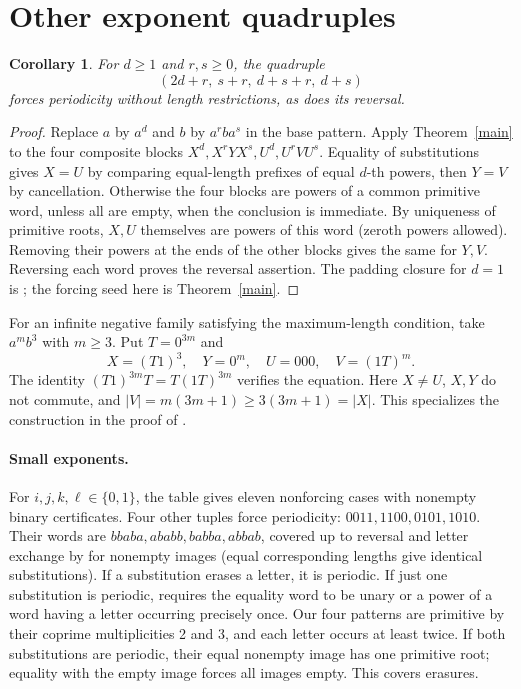 \documentclass[10pt]{article}
\newtheorem{corollary}[theorem]{Corollary}
\theoremstyle{remark}\newtheorem*{remark}{Remark}
\begin{document}
\section{Other exponent quadruples}
\begin{corollary}
For \(d\ge1\) and \(r,s\ge0\), the quadruple
\[
 (2d+r,\ s+r,\ d+s+r,\ d+s)
\]
forces periodicity without length restrictions, as does its reversal.
\end{corollary}
\begin{proof}
Replace \(a\) by \(a^d\) and \(b\) by \(a^r b a^s\) in the base pattern. Apply Theorem~\ref{main} to the four composite blocks \(X^d,X^rYX^s,U^d,U^rVU^s\). Equality of substitutions gives \(X=U\) by comparing equal-length prefixes of equal \(d\)-th powers, then \(Y=V\) by cancellation. Otherwise the four blocks are powers of a common primitive word, unless all are empty, when the conclusion is immediate. By uniqueness of primitive roots, \(X,U\) themselves are powers of this word (zeroth powers allowed). Removing their powers at the ends of the other blocks gives the same for \(Y,V\). Reversing each word proves the reversal assertion. The padding closure for \(d=1\) is \cite[Lemma 26]{hs}; the forcing seed here is Theorem~\ref{main}.
\end{proof}
For an infinite negative family satisfying the maximum-length condition, take \(a^m b^3\) with \(m\ge3\). Put \(T=0^{3m}\) and
\[
 X=(T1)^3,\quad Y=0^m,\quad U=000,\quad V=(1T)^m .
\]
The identity \((T1)^{3m}T=T(1T)^{3m}\) verifies the equation. Here \(X\ne U\), \(X,Y\) do not commute, and \(|V|=m(3m+1)\ge 3(3m+1)=|X|\). This specializes the construction in the proof of \cite[Theorem 30]{hs}.

\paragraph{Small exponents.}
For \(i,j,k,\ell\in\{0,1\}\), the table gives eleven nonforcing cases with nonempty binary certificates. Four other tuples force periodicity: \(0011,1100,0101,1010\). Their words are \(bbaba,ababb,babba,abbab\), covered up to reversal and letter exchange by \cite[Lemmas 14--15]{hs} for nonempty images (equal corresponding lengths give identical substitutions). If a substitution erases a letter, it is periodic. If just one substitution is periodic, \cite[Theorem 1]{periodic} requires the equality word to be unary or a power of a word having a letter occurring precisely once. Our four patterns are primitive by their coprime multiplicities 2 and 3, and each letter occurs at least twice. If both substitutions are periodic, their equal nonempty image has one primitive root; equality with the empty image forces all images empty. This covers erasures.
\end{document}
